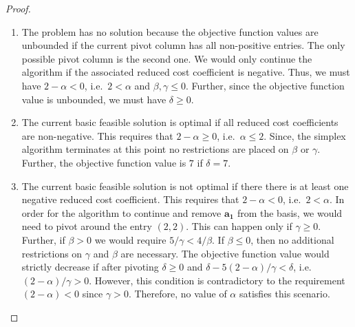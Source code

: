 \documentclass[12pt]{article}
\theoremstyle{definition}
\newcommand{\vect}[1]{\boldsymbol{#1}}
\begin{document}
\begin{proof}
  \begin{enumerate}
    \item The problem has no solution because the objective function values are
      unbounded if the current pivot column has all non-positive entries. The only
      possible pivot column is the second one. We would only continue the algorithm
      if the associated reduced cost coefficient is negative. Thus, we must have
      $2-\alpha < 0$, i.e.\ $2 < \alpha$ and $\beta, \gamma \leq 0$. Further,
      since the objective function value is unbounded, we must have
      $\delta \geq 0$.
    \item The current basic feasible solution is optimal if all reduced cost
      coefficients are non-negative. This requires that $2-\alpha \geq 0$, i.e.\
      $\alpha \leq 2$. Since, the simplex algorithm terminates at this point no restrictions are placed
      on $\beta$ or $\gamma$. Further, the objective function value is $7$ if $\delta = 7$.
    \item The current basic feasible solution is not optimal if there there is at least
      one negative reduced cost coefficient. This requires that $2-\alpha < 0$, i.e.\ $2 < \alpha$.
      In order for the algorithm to continue and remove $\vect{a_1}$ from the basis,
      we would need to pivot around the entry $(2,2)$. This can happen only if $\gamma \geq 0$.
      Further, if $\beta > 0$ we would require $5/\gamma < 4/\beta$. If $\beta \leq 0$,
      then no additional restrictions on $\gamma$ and $\beta$ are necessary. The objective function value would strictly decrease if after pivoting
      $\delta \geq 0$ and $\delta - 5(2-\alpha)/\gamma < \delta$, i.e.\ $(2-\alpha)/\gamma > 0$. However, this condition is
      contradictory to the requirement $(2-\alpha) < 0$ since $\gamma > 0$. Therefore, no value
      of $\alpha$ satisfies this scenario.
  \end{enumerate}
\end{proof}
\end{document}
